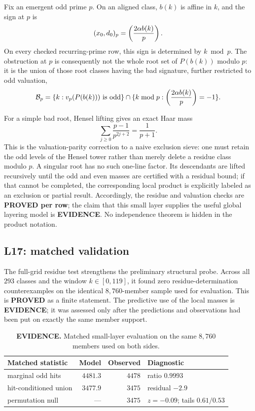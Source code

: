 Fix an emergent odd prime $p$.  On an aligned class, $b(k)$ is affine in
$k$, and the sign at $p$ is
\[
 (x_0,d_0)_p=\left(\frac{2\alpha b(k)}{p}\right).
\]
On every checked recurring-prime row, this sign is determined by
$k\bmod p$.  The obstruction at $p$ is consequently not the whole root
set of $P(b(k))$ modulo $p$: it is the union of those root classes having
the bad signature, further restricted to odd valuation,
\[
 \mathcal B_p=\{k:v_p(P(b(k)))\ \text{is odd}\}
 \cap\{k\bmod p:\left(\frac{2\alpha b(k)}{p}\right)=-1\}.
\]

For a simple bad root, Hensel lifting gives an exact Haar mass
\[
 \sum_{j\geq0}\frac{p-1}{p^{2j+2}}=\frac{1}{p+1}.
\]
This is the valuation-parity correction to a naive exclusion sieve:
one must retain the odd levels of the Hensel tower rather than merely
delete a residue class modulo $p$.  A singular root has no such
one-line factor.  Its descendants are lifted recursively until the odd
and even masses are certified with a residual bound; if that cannot be
completed, the corresponding local product is explicitly labeled as
an exclusion or partial result.
Accordingly, the residue and valuation checks are \textbf{PROVED per
row}; the claim that this small layer supplies the useful global
layering model is \textbf{EVIDENCE}.  No independence theorem is hidden
in the product notation.

\subsection{L17: matched validation}

The full-grid residue test strengthens the preliminary structural
probe.  Across all $293$ classes and the window $k\in[0,119]$, it found
zero residue-determination counterexamples on the identical
$8{,}760$-member sample used for evaluation.
This is \textbf{PROVED} as a finite statement.  The predictive use of
the local masses is \textbf{EVIDENCE}; it was assessed only after the
predictions and observations had been put on exactly the same member
support.

\begin{table}[ht]
\centering
\begin{tabular}{@{}lrrl@{}}
\toprule
Matched statistic & Model & Observed & Diagnostic \\
\midrule
marginal odd hits & $4481.3$ & $4478$ & ratio $0.9993$ \\ %
hit-conditioned union & $3477.9$ & $3475$ & residual $-2.9$ \\ %
permutation null & --- & $3475$ & $z=-0.09$; tails $0.61/0.53$ \\ %
\bottomrule
\end{tabular}
\caption{\textbf{EVIDENCE.}  Matched small-layer evaluation on the same
$8{,}760$ members used on both sides.}
\end{table}

